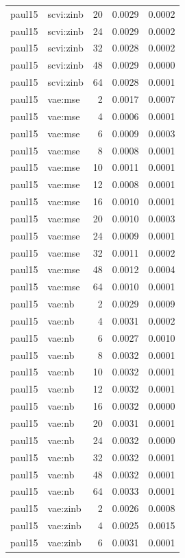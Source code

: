 \begin{tabular}{llrrr}
paul15 & scvi:zinb & 20 & 0.0029 & 0.0002 \\
paul15 & scvi:zinb & 24 & 0.0029 & 0.0002 \\
paul15 & scvi:zinb & 32 & 0.0028 & 0.0002 \\
paul15 & scvi:zinb & 48 & 0.0029 & 0.0000 \\
paul15 & scvi:zinb & 64 & 0.0028 & 0.0001 \\
paul15 & vae:mse & 2 & 0.0017 & 0.0007 \\
paul15 & vae:mse & 4 & 0.0006 & 0.0001 \\
paul15 & vae:mse & 6 & 0.0009 & 0.0003 \\
paul15 & vae:mse & 8 & 0.0008 & 0.0001 \\
paul15 & vae:mse & 10 & 0.0011 & 0.0001 \\
paul15 & vae:mse & 12 & 0.0008 & 0.0001 \\
paul15 & vae:mse & 16 & 0.0010 & 0.0001 \\
paul15 & vae:mse & 20 & 0.0010 & 0.0003 \\
paul15 & vae:mse & 24 & 0.0009 & 0.0001 \\
paul15 & vae:mse & 32 & 0.0011 & 0.0002 \\
paul15 & vae:mse & 48 & 0.0012 & 0.0004 \\
paul15 & vae:mse & 64 & 0.0010 & 0.0001 \\
paul15 & vae:nb & 2 & 0.0029 & 0.0009 \\
paul15 & vae:nb & 4 & 0.0031 & 0.0002 \\
paul15 & vae:nb & 6 & 0.0027 & 0.0010 \\
paul15 & vae:nb & 8 & 0.0032 & 0.0001 \\
paul15 & vae:nb & 10 & 0.0032 & 0.0001 \\
paul15 & vae:nb & 12 & 0.0032 & 0.0001 \\
paul15 & vae:nb & 16 & 0.0032 & 0.0000 \\
paul15 & vae:nb & 20 & 0.0031 & 0.0001 \\
paul15 & vae:nb & 24 & 0.0032 & 0.0000 \\
paul15 & vae:nb & 32 & 0.0032 & 0.0001 \\
paul15 & vae:nb & 48 & 0.0032 & 0.0001 \\
paul15 & vae:nb & 64 & 0.0033 & 0.0001 \\
paul15 & vae:zinb & 2 & 0.0026 & 0.0008 \\
paul15 & vae:zinb & 4 & 0.0025 & 0.0015 \\
paul15 & vae:zinb & 6 & 0.0031 & 0.0001 \\

\end{tabular}

